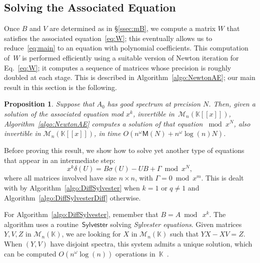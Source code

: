 \documentclass[]{sig-alternate}
\def\partial{\delta}
\def\Sylvester{\mathsf{Sylvester}}
\def\K {\ensuremath{\mathbb{K}}}
\def\M {\ensuremath{\mathsf{M}}}
\def\mB {\ensuremath{{B}}}
\def\mU {\ensuremath{{U}}}
\def\mV {\ensuremath{{V}}}
\def\mW {\ensuremath{{W}}}
\newtheorem{Prop}{Proposition}
\begin{document}
\subsection{Solving the Associated Equation}\label{ssec:mW}

Once $\mB$ and $\mV$ are determined as in \S\ref{ssec:mB}, we compute
a matrix $\mW$ that satisfies the associated equation~\eqref{eq:W};
this  eventually allows us to reduce~\eqref{eq:main} to an equation
with polynomial coefficients.  This computation of~$\mW$ is performed
efficiently using a suitable version of Newton iteration for
Eq.~\eqref{eq:W}; it computes a sequence of matrices whose precision
is roughly doubled at each stage.  This is described in
Algorithm~\ref{algo:NewtonAE}; our main result in this section is the
following.

\begin{Prop}\label{prop:W}
  Suppose that $A_0$ has good spectrum at precision $N$.  Then, given
  a solution of the associated equation mod $x^k$, invertible
  in~$\mathscr{M}_n(\K[[x]])$, Algorithm~\ref{algo:NewtonAE} computes
  a solution of that equation  $\bmod x^N$, also invertible
  in $\mathscr{M}_n(\K[[x]])$, in time $O(n^\omega \M(N)+n^\omega
  \log(n) N)$.
\end{Prop}

Before proving this result, we show how to solve yet another type of
equations that appear in an intermediate step:
\begin{equation}\label{eq:WB}
x^k \partial(\mU) = \mB \sigma(\mU)- \mU\mB + \Gamma \bmod x^N,
\end{equation}
where all matrices involved have size $n\times n$, with $\Gamma = 0 \bmod x^m$. This is dealt with by
Algorithm~\ref{algo:DiffSylvester} when $k = 1$ or $q\ne 1$ and Algorithm~\ref{algo:DiffSylvesterDiff} otherwise.

For Algorithm~\ref{algo:DiffSylvester}, remember that $B=A \bmod~x^k$.
The algorithm uses a routine~$\Sylvester$ solving {\em Sylvester
  equations}. Given matrices $Y,V,Z$ in $\mathscr{M}_n(\K)$, we are
looking for $X$ in $\mathscr{M}_{n}(\K)$ such that $Y X-XV=Z.$ When
$(Y,V)$ have disjoint spectra, this system admits a unique solution,
which can be computed $O(n^\omega\log(n))$ operations
in~$\K$~\cite{Kirrinnis01}.
\end{document}
